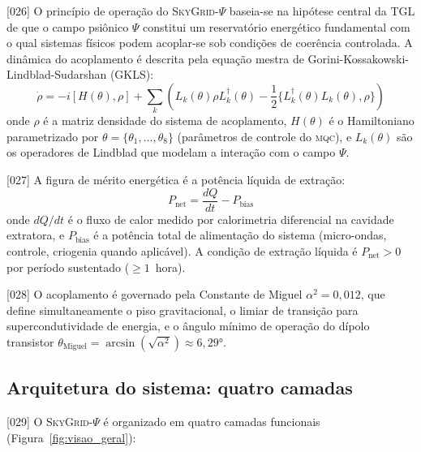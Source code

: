 \documentclass[12pt,a4paper]{article}
\newcommand{\alphaii}{\alpha^2}
\newcommand{\thetaM}{\theta_{\text{Miguel}}}
\newcommand{\Psifield}{\Psi}
\newcommand{\MQC}{\textsc{mqc}}
\newcommand{\SkyGrid}{\textsc{SkyGrid}-$\Psifield$}
\newcommand{\Pnet}{P_{\text{net}}}
\newcommand{\Pbias}{P_{\text{bias}}}
\begin{document}
{[026]} O princípio de operação do \SkyGrid{} baseia-se na hipótese central da TGL de que o campo psiônico $\Psifield$ constitui um reservatório energético fundamental com o qual sistemas físicos podem acoplar-se sob condições de coerência controlada. A dinâmica do acoplamento é descrita pela equação mestra de Gorini-Kossakowski-Lindblad-Sudarshan (GKLS):
\begin{equation}
\label{eq:lindblad}
\dot{\rho} = -i[H(\theta), \rho] + \sum_k \left( L_k(\theta)\rho L_k^\dagger(\theta) - \frac{1}{2}\{L_k^\dagger(\theta)L_k(\theta), \rho\} \right)
\end{equation}
onde $\rho$ é a matriz densidade do sistema de acoplamento, $H(\theta)$ é o Hamiltoniano parametrizado por $\theta = \{\theta_1, \ldots, \theta_8\}$ (parâmetros de controle do \MQC), e $L_k(\theta)$ são os operadores de Lindblad que modelam a interação com o campo $\Psifield$.

{[027]} A figura de mérito energética é a potência líquida de extração:
\begin{equation}
\label{eq:pnet}
\Pnet = \frac{dQ}{dt} - \Pbias
\end{equation}
onde $dQ/dt$ é o fluxo de calor medido por calorimetria diferencial na cavidade extratora, e $\Pbias$ é a potência total de alimentação do sistema (micro-ondas, controle, criogenia quando aplicável). A condição de extração líquida é $\Pnet > 0$ por período sustentado ($\geq 1$~hora).

{[028]} O acoplamento é governado pela Constante de Miguel $\alphaii = 0{,}012$, que define simultaneamente o piso gravitacional, o limiar de transição para supercondutividade de energia, e o ângulo mínimo de operação do dípolo transistor $\thetaM = \arcsin(\sqrt{\alphaii}) \approx 6{,}29°$.

\subsection{Arquitetura do sistema: quatro camadas}
\label{sec:arquitetura}

{[029]} O \SkyGrid{} é organizado em quatro camadas funcionais (Figura~\ref{fig:visao_geral}):
\end{document}
